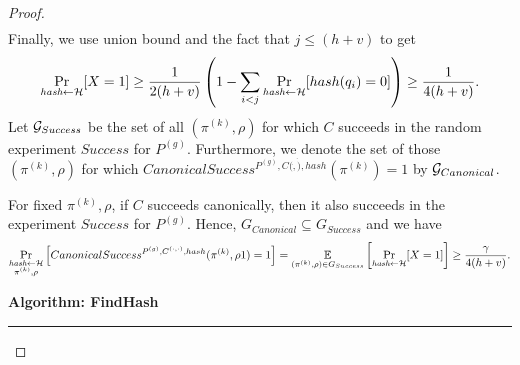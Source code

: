\begin{proof}
\begin{align*}
\end{align*}
Finally, we use union bound and the fact that $j \leq (h+v)$ to get
\begin{align*}
\underset{\textit{hash} \leftarrow \mathcal{H}}{\Pr}[X=1] \geq
\frac{1}{2(h+v)} \left( 1 - \sum_{i < j} \underset{\textit{hash} \leftarrow \mathcal{H}}{\Pr}[hash(q_i) = 0] \right) \geq \frac{1}{4(h+v)}.
\end{align*}
Let $\mathcal{G}_{Success}$ be the set of all $(\pi^{(k)},\rho)$ for which $C$ succeeds in the random experiment $Success$ for $P^{(g)}$. Furthermore,
we denote the set of those $(\pi^{(k)},\rho)$ for which $CanonicalSuccess^{P^{(g)}, C(\dot, \dot), hash}(\pi^{(k)}) = 1$ by $\mathcal{G}_{Canonical}$.

For fixed $\pi^{(k)}, \rho$, if $C$ succeeds canonically, then it also succeeds in the experiment $Success$ for $P^{(g)}$.
Hence, $G_{Canonical} \subseteq G_{Success}$ and we have
\begin{align}
  \label{ineq:hash_high_prob}
\underset{\substack{\textit{hash} \leftarrow \mathcal{H} \\ \pi^{(k)}, \rho}}{\Pr}\left[CanonicalSuccess^{P^{(g)}, C^{(\cdot, \cdot)}, hash}(\pi^{(k)}, \rho1) = 1\right] =
\underset{{(\pi^{(k)},\rho) \in G_{Success}}}{\mathbb{E}}\left[\underset{\substack{\textit{hash} \leftarrow \mathcal{H}}}{\Pr}[X = 1]\right]
\geq \frac{\gamma}{4(h+v)}.
\end{align}
%
\begin{codeblock}
  \textbf{Algorithm: FindHash}
  \medskip
  \hrule
  \medskip


\end{codeblock}
\end{proof}
